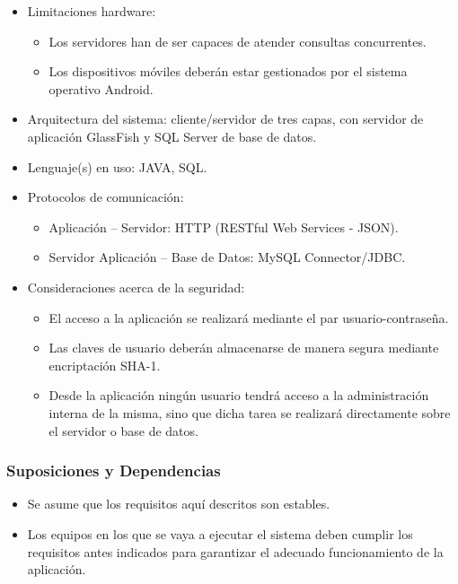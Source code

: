\begin{itemize}	
	\item Limitaciones hardware:
	\begin{itemize}
		\item Los servidores han de ser capaces de atender consultas concurrentes.
		\item Los dispositivos móviles deberán estar gestionados por el sistema operativo Android.
	\end{itemize}
	\item Arquitectura del sistema: cliente/servidor de tres capas, con servidor de aplicación GlassFish y SQL Server de base de datos.
	\item Lenguaje(s) en uso: JAVA, SQL.
	\item Protocolos de comunicación: 
	\begin{itemize}
		\item Aplicación -- Servidor: HTTP (RESTful Web Services - JSON).
		\item Servidor Aplicación -- Base de Datos: MySQL Connector/JDBC.
	\end{itemize}
	\item Consideraciones acerca de la seguridad:
	\begin{itemize}
		\item El acceso a la aplicación se realizará mediante el par usuario-contraseña.
		\item Las claves de usuario deberán almacenarse de manera segura mediante encriptación SHA-1.
		\item Desde la aplicación ningún usuario tendrá acceso a la administración interna de la misma, sino que dicha tarea se realizará directamente sobre el servidor o base de datos.
	\end{itemize}
\end{itemize}

\subsubsection{Suposiciones y Dependencias}

\begin{itemize}	
	\item Se asume que los requisitos aquí descritos son estables.
	\item Los equipos en los que se vaya a ejecutar el sistema deben cumplir los requisitos antes indicados para garantizar el adecuado funcionamiento de la aplicación.
\end{itemize}

